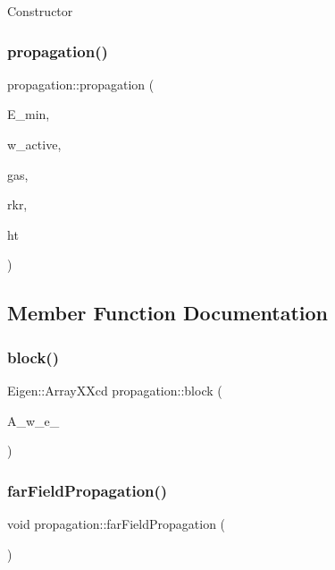 Constructor \mbox{\label{classpropagation_a2580bb2332faef03bfb6d761ee55bb6d}} 
\subsubsection{\texorpdfstring{propagation()}{propagation()}\hspace{0.1cm}{\footnotesize\ttfamily [2/2]}}
{\footnotesize\ttfamily propagation\+::propagation (\begin{DoxyParamCaption}\item[{double}]{E\+\_\+min,  }\item[{Eigen\+::\+Array\+Xd}]{w\+\_\+active,  }\item[{\hyperlink{classkeldysh__gas}{keldysh\+\_\+gas}}]{gas,  }\item[{grid\+\_\+rkr}]{rkr,  }\item[{D\+HT}]{ht }\end{DoxyParamCaption})}



\subsection{Member Function Documentation}
\mbox{\label{classpropagation_af12b15d9b91f98516c0ff25efc1233d1}} 
\subsubsection{\texorpdfstring{block()}{block()}}
{\footnotesize\ttfamily Eigen\+::\+Array\+X\+Xcd propagation\+::block (\begin{DoxyParamCaption}\item[{Eigen\+::\+Array\+X\+Xcd}]{A\+\_\+w\+\_\+e\+\_\+ }\end{DoxyParamCaption})}

\mbox{\label{classpropagation_a9c2e1cb4e314c173b26de08ffcfe071d}} 
\subsubsection{\texorpdfstring{far\+Field\+Propagation()}{farFieldPropagation()}}
{\footnotesize\ttfamily void propagation\+::far\+Field\+Propagation (\begin{DoxyParamCaption}{ }\end{DoxyParamCaption})}

